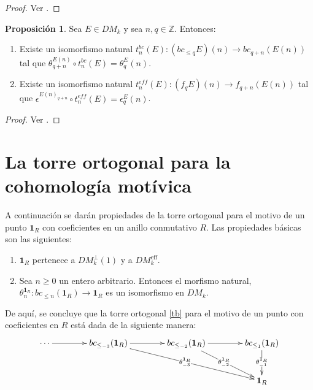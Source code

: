 \documentclass[10pt]{amsart}
\theoremstyle{definition}
\newtheorem{proposition}[definition]{Proposici\'on}
\theoremstyle{remark}
\theoremstyle{definition}
\begin{document}
\begin{proof}
Ver \cite[Lema 3.3.2]{Pel17}.
\end{proof}

\begin{proposition}
Sea $E \in DM_{k}$ y sea $n,q \in \mathbb{Z}$. Entonces:
\begin{enumerate}
\item Existe un isomorfismo natural $t^{bc}_{n}(E):(bc_{\leq q}E)(n) \rightarrow bc_{q+n}(E(n))$ tal que $\theta^{E(n)}_{q+n} \circ t^{bc}_{n}(E)=\theta^{E}_{q}(n)$.
\item Existe un isomorfismo natural $t^{eff}_{n}(E):(f_{q}E)(n) \rightarrow f_{q+n}(E(n))$ tal que $\epsilon^{E(n)_{q+n}} \circ t^{eff}_{n}(E)=\epsilon^{E}_{q}(n)$.
\end{enumerate}


\end{proposition}

\begin{proof}
Ver \cite[Lema 3.3.3]{Pel17}.
\end{proof}


\section{La torre ortogonal para la cohomolog\'ia mot\'ivica}
A continuación se darán propiedades de la torre ortogonal para el motivo de un punto $\textbf{1}_{R}$ con coeficientes en un anillo conmutativo $R$. Las propiedades básicas son las siguientes:
\begin{enumerate}
\item $\textbf{1}_{R}$ pertenece a $DM^{\perp}_{k}(1)$ y a $DM^{\textrm{eff}}_{k}$.
\item Sea $n\geq 0$ un entero arbitrario. Entonces el morfismo natural, $\theta^{\textbf{1}_{R}}_{n}:bc_{\leq n}(\textbf{1}_{R}) \rightarrow \textbf{1}_{R}$ es un isomorfismo en $DM_{k}$.
\end{enumerate}

De aquí, se concluye que la torre ortogonal \ref{tb} para el motivo de un punto con coeficientes en $R$ está dada de la siguiente manera:
$$\xymatrix@R=10mm@C=14mm{
	\cdots
	\ar@{->}[r]^{}
	&
	bc_{\leq_{-3}}(\textbf{1}_{R})
	\ar@{->}[r]^{} 
	\ar@{->}[drr]|{\theta_{-3}^{\textbf{1}_{R}}} 
	&
	bc_{\leq_{-2}}(\textbf{1}_{R})
	\ar@{->}[r]
	\ar@{->}[dr]|{\theta_{-2}^{\textbf{1}_{R}}}
	&
	bc_{\leq_{1}}(\textbf{1}_{R}) 
	\ar@{->}[d]|{\theta_{-1}^{\textbf{1}_{R}}} 
	\\
	&
	&
	&
	\textbf{1}_{R}
}$$
\end{document}

